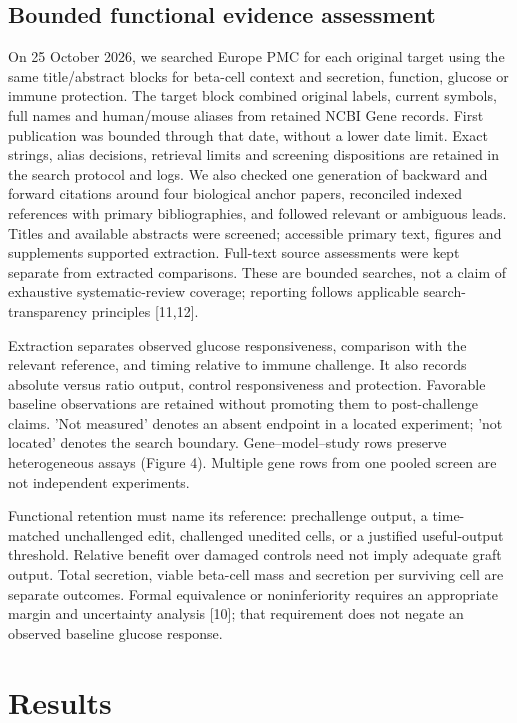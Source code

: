 \documentclass[11pt,letterpaper]{article}
\begin{document}
\subsection*{Bounded functional evidence assessment}
On 25 October 2026, we searched Europe PMC for each original target using the same title/abstract blocks for beta-cell context and secretion, function, glucose or immune protection. The target block combined original labels, current symbols, full names and human/mouse aliases from retained NCBI Gene records. First publication was bounded through that date, without a lower date limit. Exact strings, alias decisions, retrieval limits and screening dispositions are retained in the search protocol and logs. We also checked one generation of backward and forward citations around four biological anchor papers, reconciled indexed references with primary bibliographies, and followed relevant or ambiguous leads. Titles and available abstracts were screened; accessible primary text, figures and supplements supported extraction. Full-text source assessments were kept separate from extracted comparisons. These are bounded searches, not a claim of exhaustive systematic-review coverage; reporting follows applicable search-transparency principles [11,12].\par
Extraction separates observed glucose responsiveness, comparison with the relevant reference, and timing relative to immune challenge. It also records absolute versus ratio output, control responsiveness and protection. Favorable baseline observations are retained without promoting them to post-challenge claims. 'Not measured' denotes an absent endpoint in a located experiment; 'not located' denotes the search boundary. Gene--model--study rows preserve heterogeneous assays (Figure 4). Multiple gene rows from one pooled screen are not independent experiments.\par
Functional retention must name its reference: prechallenge output, a time-matched unchallenged edit, challenged unedited cells, or a justified useful-output threshold. Relative benefit over damaged controls need not imply adequate graft output. Total secretion, viable beta-cell mass and secretion per surviving cell are separate outcomes. Formal equivalence or noninferiority requires an appropriate margin and uncertainty analysis [10]; that requirement does not negate an observed baseline glucose response.\par
\section*{Results}
\end{document}

